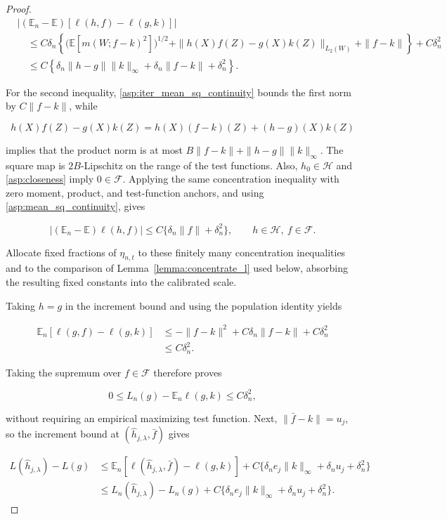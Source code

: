 \begin{proof}
\[
\begin{split}
&\left|(\mathbb E_n-\mathbb E)[\ell(h,f)-\ell(g,k)]\right|\\
&\quad\leqslant C\delta_n\left\{
\bigl(\mathbb E[m(W;f-k)^2]\bigr)^{1/2}
+\|h(X)f(Z)-g(X)k(Z)\|_{L_2(W)}
+\|f-k\|\right\}+C\delta_n^2\\
&\quad\leqslant C\left\{\delta_n\|h-g\|\|k\|_\infty
+\delta_n\|f-k\|+\delta_n^2\right\}.
\end{split}
\]

For the second inequality, \cref{asp:iter_mean_sq_continuity} bounds the first norm by $C\|f-k\|$, while

\[
h(X)f(Z)-g(X)k(Z)
=h(X)(f-k)(Z)+(h-g)(X)k(Z)
\]

implies that the product norm is at most $B\|f-k\|+\|h-g\|\|k\|_\infty$. The square map is $2B$-Lipschitz on the range of the test functions. Also, $h_0\in\mathcal H$ and \cref{asp:closeness} imply $0\in\mathcal F$. Applying the same concentration inequality with zero moment, product, and test-function anchors, and using \cref{asp:mean_sq_continuity}, gives

\[
\left|(\mathbb E_n-\mathbb E)\ell(h,f)\right|
\leqslant C\{\delta_n\|f\|+\delta_n^2\},
\qquad h\in\mathcal H,\ f\in\mathcal F.
\]

Allocate fixed fractions of $\eta_{n,t}$ to these finitely many concentration inequalities and to the comparison of Lemma~\ref{lemma:concentrate_l} used below, absorbing the resulting fixed constants into the calibrated scale. 

Taking $h=g$ in the increment bound and using the population identity yields

\[
\begin{split}
\mathbb E_n[\ell(g,f)-\ell(g,k)]
&\leqslant-\|f-k\|^2+C\delta_n\|f-k\|+C\delta_n^2\\
&\leqslant C\delta_n^2.
\end{split}
\]

Taking the supremum over $f\in\mathcal F$ therefore proves

\[
0\leqslant L_n(g)-\mathbb E_n\ell(g,k)\leqslant C\delta_n^2,
\]

without requiring an empirical maximizing test function. Next, $\|\bar f-k\|=u_j$, so the increment bound at $(\hat h_{j,\lambda},\bar f)$ gives

\[
\begin{split}
L(\hat h_{j,\lambda})-L(g)
&\leqslant\mathbb E_n[\ell(\hat h_{j,\lambda},\bar f)-\ell(g,k)]
+C\{\delta_ne_j\|k\|_\infty+\delta_nu_j+\delta_n^2\}\\
&\leqslant L_n(\hat h_{j,\lambda})-L_n(g)
+C\{\delta_ne_j\|k\|_\infty+\delta_nu_j+\delta_n^2\}.
\end{split}
\]


\end{proof}
